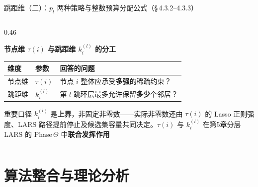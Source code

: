 \documentclass[aspectratio=169,9pt,xcolor=dvipsnames]{beamer}
\newcommand{\blue}[1]{\textcolor{mynavy}{#1}}
\newcommand{\chapternote}{}
\newif\ifshowchapternote
\newcommand{\setchapternote}[1]{%
  \renewcommand{\chapternote}{#1}%
  \showchapternotetrue
}
\begin{document}
\begin{frame}{跳距维（二）：$p_l$ 两种策略与整数预算分配公式（§\,4.3.2--4.3.3）}
\begin{columns}[T]
\begin{column}{0.46\textwidth}

  \textbf{\blue{节点维 $\tau(i)$ 与跳距维 $k_i^{(l)}$ 的分工}}

  \begin{tabular}{m{1cm}m{1cm}m{3.5cm}}
    \toprule
    维度 & 参数 & 回答的问题 \\
    \midrule
    节点维 & $\tau(i)$ & 节点 $i$ 整体应承受\textbf{多强}的稀疏约束？ \\[4pt]
    跳距维 & $k_i^{(l)}$ & 第 $l$ 跳环层最多允许保留\textbf{多少}个邻居？ \\
    \bottomrule
  \end{tabular}

  \vspace{-0.08cm}
  \begin{alertblock}{重要口径}
     $k_i^{(l)}$ 是\textbf{上界}，非固定非零数——实际非零数还由 $\tau(i)$ 的 Lasso 正则强度、LARS 路径提前停止及候选集容量共同决定。$\tau(i)$ 与 $k_i^{(l)}$ 在第5章分层 LARS 的 Phase\,$\Theta$ 中\textbf{联合发挥作用}
  \end{alertblock}
\end{column}
\end{columns}
\end{frame}

\section{算法整合与理论分析}
\setchapternote{第5章}
\end{document}
